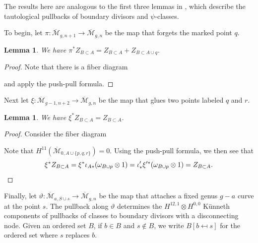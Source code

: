 \documentclass[12pt]{amsart}
\newtheorem{lem}[thm]{Lemma}
\theoremstyle{definition}
\numberwithin{equation}{section}
\newcommand{\M}{\mathcal{M}}
\newcommand{\Mb}{\overline{\M}}
\theoremstyle{definition} %
\theoremstyle{remark}
\begin{document}
The results here are analogous to the first three lemmas in \cite[Section 3]{ArbarelloCornalba}, which describe the tautological pullbacks of boundary divisors and $\psi$-classes. 

To begin, let $\pi \colon \Mb_{g,n+1} \to \Mb_{g,n}$ be the map that forgets the marked point $q$.

\begin{lem}\label{forgetq}
We have
$\pi^*Z_{B \subset A} = Z_{B \subset A} + Z_{B \subset A \cup q}.$
\end{lem}
\begin{proof}
Note that there is a fiber diagram
\begin{center}
\end{center}
and apply the push-pull formula.
\end{proof}

Next let $\xi \colon \Mb_{g-1,n+2} \to \Mb_{g,n}$ be the map that glues two points labeled $q$ and $r$.
\begin{lem} \label{xilem}
We have
$
 \xi^* Z_{B \subset A} = Z_{B \subset A}   
$.
\end{lem}

\begin{proof}
Consider the fiber diagram
\begin{center}
\end{center}
Note that $H^{11}(\Mb_{0, A \cup \{p,q,r\}}) = 0$.
Using the push-pull formula, we then see that
\[\xi^*Z_{B \subset A} = \xi^*\iota_{A*}(\omega_{B \cup p} \otimes 1) = \iota'_*\xi'^*(\omega_{B\cup p} \otimes 1)= Z_{B \subset A}. \qedhere \]
\end{proof}

Finally, let $\vartheta \colon \Mb_{a, S \cup s} \to \Mb_{g,n}$ be the map that attaches a fixed genus $g - a$ curve at the point $s$. The pullback along $\vartheta$ determines the $H^{12,1} \otimes H^{0,0}$ K\"unneth components of pullbacks of classes to boundary divisors with a disconnecting node.
Given an ordered set $B$, if $b \in B$ and $s \notin B$, we write $B[b \mapsfrom s]$ for the ordered set where $s$ replaces $b$.
\end{document}
